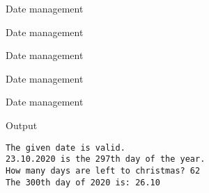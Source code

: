 \documentclass[usenames,dvipsnames,aspectratio=169]{beamer}
\begin{document}
\begin{frame}{Date management}
  \begin{exampleblock}{}
    \scriptsize
    
  \end{exampleblock}
\end{frame}

\begin{frame}{Date management}
  \begin{exampleblock}{}
    \scriptsize
    
  \end{exampleblock}
\end{frame}

\begin{frame}{Date management}
  \begin{exampleblock}{}
    \small
    
  \end{exampleblock}
\end{frame}

\begin{frame}{Date management}
  \begin{exampleblock}{}
    \footnotesize
    
  \end{exampleblock}
\end{frame}

\begin{frame}[fragile]{Date management}
  \begin{block}{Output}
    \begin{verbatim}
The given date is valid.
23.10.2020 is the 297th day of the year.
How many days are left to christmas? 62
The 300th day of 2020 is: 26.10
\end{verbatim}
  \end{block}
\end{frame}
\end{document}
